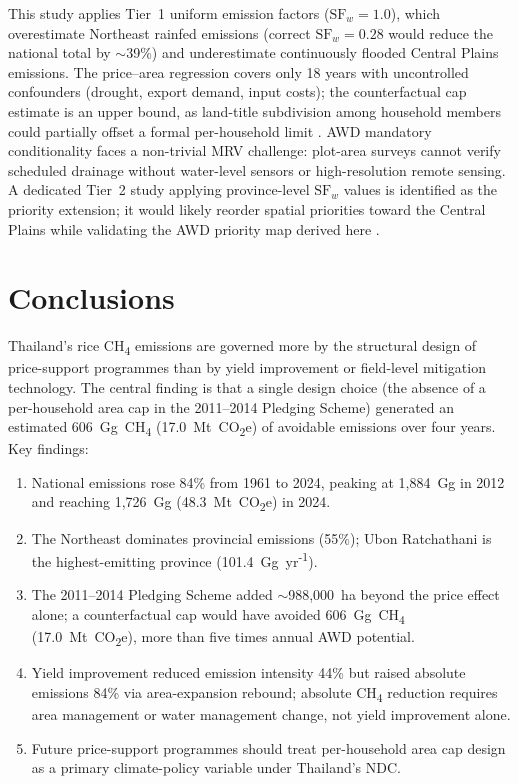\documentclass[fleqn,10pt]{olplainarticle}
\begin{document}
This study applies Tier~1 uniform emission factors ($\text{SF}_w = 1.0$),
which overestimate Northeast rainfed emissions (correct $\text{SF}_w = 0.28$
would reduce the national total by $\sim$39\%) and underestimate continuously
flooded Central Plains emissions.
The price--area regression covers only 18 years with uncontrolled confounders
(drought, export demand, input costs); the counterfactual cap estimate is an
upper bound, as land-title subdivision among household members could partially
offset a formal per-household limit \citep{poapongsakorn2014}.
AWD mandatory conditionality faces a non-trivial MRV challenge: plot-area
surveys cannot verify scheduled drainage without water-level sensors or
high-resolution remote sensing.
A dedicated Tier~2 study applying province-level $\text{SF}_w$ values
is identified as the priority extension; it would likely reorder spatial
priorities toward the Central Plains while validating the AWD priority map
derived here \citep{wassmann2000, yan2009}.

\section*{Conclusions}

Thailand's rice CH\textsubscript{4} emissions are governed more by the
structural design of price-support programmes than by yield improvement or
field-level mitigation technology.
The central finding is that a single design choice (the absence of a
per-household area cap in the 2011--2014 Pledging Scheme) generated an
estimated 606~Gg~CH\textsubscript{4} (17.0~Mt~CO\textsubscript{2}e) of
avoidable emissions over four years.
Key findings:

\begin{enumerate}[noitemsep]
  \item National emissions rose 84\% from 1961 to 2024, peaking at 1,884~Gg
        in 2012 and reaching 1,726~Gg (48.3~Mt~CO\textsubscript{2}e) in 2024.
  \item The Northeast dominates provincial emissions (55\%); Ubon Ratchathani
        is the highest-emitting province (101.4~Gg~yr\textsuperscript{-1}).
  \item The 2011--2014 Pledging Scheme added $\sim$988,000~ha beyond the price
        effect alone; a counterfactual cap would have avoided 606~Gg~CH\textsubscript{4}
        (17.0~Mt~CO\textsubscript{2}e), more than five times annual AWD potential.
  \item Yield improvement reduced emission intensity 44\% but raised absolute
        emissions 84\% via area-expansion rebound; absolute CH\textsubscript{4}
        reduction requires area management or water management change, not
        yield improvement alone.
  \item Future price-support programmes should treat per-household area cap
        design as a primary climate-policy variable under Thailand's NDC.
\end{enumerate}
\end{document}
